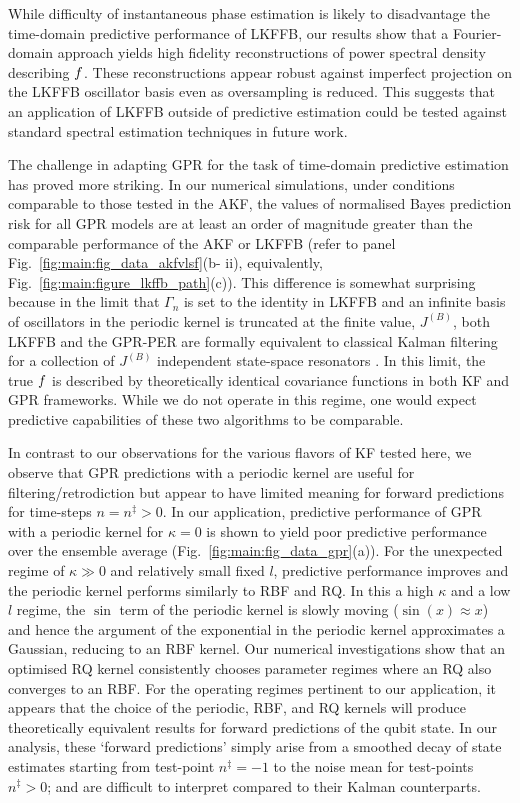 While difficulty of instantaneous phase estimation is likely to disadvantage the time-domain predictive performance of LKFFB, our results show that a Fourier-domain approach yields high fidelity reconstructions of power spectral density describing $f$. These reconstructions appear robust against imperfect projection on the LKFFB oscillator basis even as oversampling is reduced. This suggests that an application of LKFFB outside of predictive estimation could be tested against standard spectral estimation techniques in future work.

The challenge in adapting GPR for the task of time-domain predictive estimation has proved more striking.  In our numerical simulations, under conditions comparable to those tested in the AKF, the values of normalised Bayes prediction risk for all GPR models are at least an order of magnitude greater than the comparable performance of the AKF or LKFFB (refer to panel Fig.~\ref{fig:main:fig_data_akfvlsf}(b- ii), equivalently, Fig.~\ref{fig:main:figure_lkffb_path}(c)). This difference is somewhat surprising because in the limit that $\Gamma_n$ is set to the identity in LKFFB and an infinite basis of oscillators in the periodic kernel is truncated at the finite value, $J^{(B)}$, both LKFFB and the GPR-PER are formally equivalent to classical Kalman filtering for a collection of $J^{(B)}$ independent state-space resonators \cite{solin2014explicit}. In this limit, the true $f$ is described by theoretically identical covariance functions in both KF and GPR frameworks. While we do not operate in this regime, one would expect predictive capabilities of these two algorithms to be comparable. 

In contrast to our observations for the various flavors of KF tested here, we observe that GPR predictions with a periodic kernel are useful for filtering/retrodiction but appear to have limited meaning for forward predictions for time-steps $n= n^\ddagger >0$.  In our application, predictive performance of GPR with a periodic kernel for $\kappa=0$ is shown to yield poor predictive performance over the ensemble average (Fig.~\ref{fig:main:fig_data_gpr}(a)). For the unexpected regime of $\kappa \gg 0$ and relatively small fixed $l$, predictive performance improves and the periodic kernel performs similarly to RBF and RQ. In this a high $\kappa$ and a low $l$ regime, the $\sin$ term of the periodic kernel is slowly moving ($\sin(x) \approx x$) and hence the argument of the exponential in the periodic kernel approximates a Gaussian, reducing to an RBF kernel. Our numerical investigations show that an optimised RQ kernel consistently chooses parameter regimes where an RQ also converges to an RBF.  For the operating regimes pertinent to our application, it appears that the choice of the periodic, RBF, and RQ kernels will produce theoretically equivalent results for forward predictions of the qubit state. In our analysis, these `forward predictions' simply arise from a smoothed decay of state estimates starting from test-point $n^\ddagger=-1$ to the noise mean for test-points $n^\ddagger>0$; and are difficult to interpret compared to their Kalman counterparts.

